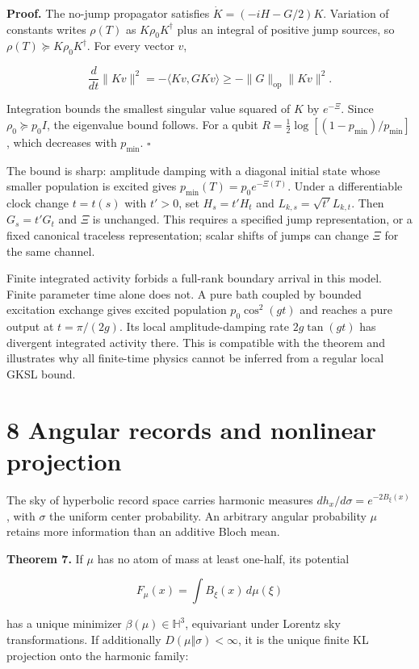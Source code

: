 \documentclass[
  11pt,
  a4paper,
]{article}
\begin{document}
\textbf{Proof.} The no-jump propagator satisfies \(\dot K=(-iH-G/2)K\). Variation of constants writes \(\rho(T)\) as \(K\rho_0K^\dagger\) plus an integral of positive jump sources, so \(\rho(T)\succeq K\rho_0K^\dagger\). For every vector \(v\),

\[\frac d{dt}\|Kv\|^2=-\langle Kv,GKv\rangle
\ge-\|G\|_{\mathrm{op}}\|Kv\|^2.\]

Integration bounds the smallest singular value squared of \(K\) by \(e^{-\Xi}\). Since \(\rho_0\succeq p_0I\), the eigenvalue bound follows. For a qubit \(R=\tfrac12\log[(1-p_{\min})/p_{\min}]\), which decreases with \(p_{\min}\). \(\square\)

The bound is sharp: amplitude damping with a diagonal initial state whose smaller population is excited gives \(p_{\min}(T)=p_0e^{-\Xi(T)}\). Under a differentiable clock change \(t=t(s)\) with \(t'>0\), set \(H_s=t'H_t\) and \(L_{k,s}=\sqrt{t'}L_{k,t}\). Then \(G_s=t'G_t\) and \(\Xi\) is unchanged. This requires a specified jump representation, or a fixed canonical traceless representation; scalar shifts of jumps can change \(\Xi\) for the same channel.

Finite integrated activity forbids a full-rank boundary arrival in this model. Finite parameter time alone does not. A pure bath coupled by bounded excitation exchange gives excited population \(p_0\cos^2(gt)\) and reaches a pure output at \(t=\pi/(2g)\). Its local amplitude-damping rate \(2g\tan(gt)\) has divergent integrated activity there. This is compatible with the theorem and illustrates why all finite-time physics cannot be inferred from a regular local GKSL bound.

\section{8 Angular records and nonlinear projection}\label{angular-records-and-nonlinear-projection}

The sky of hyperbolic record space carries harmonic measures \(dh_x/d\sigma=e^{-2B_\xi(x)}\), with \(\sigma\) the uniform center probability. An arbitrary angular probability \(\mu\) retains more information than an additive Bloch mean.

\textbf{Theorem 7.} If \(\mu\) has no atom of mass at least one-half, its potential

\[F_\mu(x)=\int B_\xi(x)\,d\mu(\xi)\]

has a unique minimizer \(\beta(\mu)\in\mathbb H^3\), equivariant under Lorentz sky transformations. If additionally \(D(\mu\Vert\sigma)<\infty\), it is the unique finite KL projection onto the harmonic family:
\end{document}
